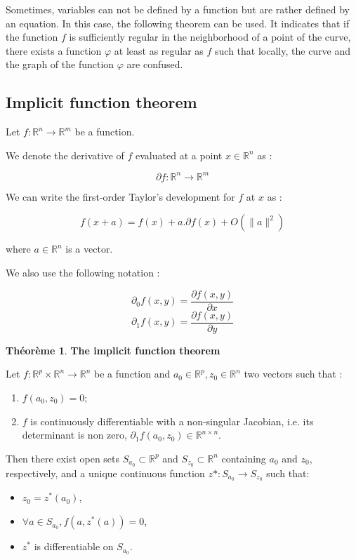 \documentclass[10pt,a4paper]{article}
\theoremstyle{definition}
\theoremstyle{definition}
\newtheorem{theorem}{Théorème}
\begin{document}
Sometimes, variables can not be defined by a function but are rather defined by an equation. In this case, the following theorem can be used. It indicates that if the function $f$ is sufficiently regular in the neighborhood of a point of the curve, there exists a function $\varphi$ at least as regular as $f$ such that locally, the curve and the graph of the function $\varphi$ are confused.

\subsection{Implicit function theorem}


Let $f: \mathbb{R}^n \rightarrow \mathbb{R}^m$ be a function.

We denote the derivative of $f$ evaluated at a point $x \in \mathbb{R}^n$ as :

\[ \partial f : \mathbb{R}^n \rightarrow \mathbb{R}^m \]

We can write the first-order Taylor's development for $f$ at $x$ as :

\[ f(x + a) = f(x) + a . \partial f(x) + O(\| a\|^2) \]


where $a \in \mathbb{R}^n$ is a vector.

We also use the following notation :

\[ \partial_0 f(x,y) = \frac{\partial f(x,y)}{\partial x}  \]
\[ \partial_1 f(x,y) = \frac{\partial f(x,y)}{\partial y}  \]

\begin{theorem}{\textbf{The implicit function theorem}}

Let $f: \mathbb{R}^p \times \mathbb{R}^n \rightarrow \mathbb{R}^n$ be a function and $a_0 \in \mathbb{R}^p , z_0 \in \mathbb{R}^n$ two vectors such that :

\begin{enumerate}
\item $f(a_0,z_0) = 0$;
\item $f$ is continuously differentiable with a non-singular Jacobian, i.e. its determinant is non zero, $\partial_1 f(a_0,z_0) \in \mathbb{R}^{n \times n}$.
\end{enumerate}
Then there exist open sets $S_{a_0} \subset \mathbb{R}^p$ and $S_{z_0} \subset \mathbb{R}^n$ containing $a_0$ and $z_0$, respectively, and a unique continuous function $z*:S_{a_0} \rightarrow S_{z_0}$ such that:
\begin{itemize}
\item $z_0=z^*(a_0)$,
\item $ \forall a \in S_{a_0}, f(a,z^*(a))=0$,
\item $z^*$ is differentiable on $S_{a_0}$.
\end{itemize}
\end{theorem}
\end{document}
